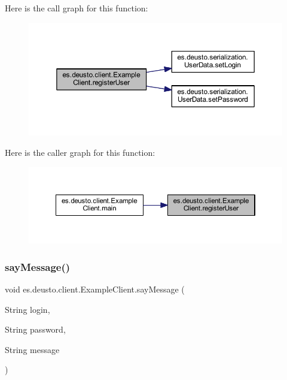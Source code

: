 Here is the call graph for this function\+:
\nopagebreak
\begin{figure}[H]
\begin{center}
\leavevmode
\includegraphics[width=350pt]{classes_1_1deusto_1_1client_1_1_example_client_afcc2d4b74c1768d39359f6e4a7a96f17_cgraph}
\end{center}
\end{figure}
Here is the caller graph for this function\+:
\nopagebreak
\begin{figure}[H]
\begin{center}
\leavevmode
\includegraphics[width=350pt]{classes_1_1deusto_1_1client_1_1_example_client_afcc2d4b74c1768d39359f6e4a7a96f17_icgraph}
\end{center}
\end{figure}
\mbox{\label{classes_1_1deusto_1_1client_1_1_example_client_a5bd90c0a118b8f1103cec4316aef33ef}} 
\subsubsection{\texorpdfstring{sayMessage()}{sayMessage()}}
{\footnotesize\ttfamily void es.\+deusto.\+client.\+Example\+Client.\+say\+Message (\begin{DoxyParamCaption}\item[{String}]{login,  }\item[{String}]{password,  }\item[{String}]{message }\end{DoxyParamCaption})}



